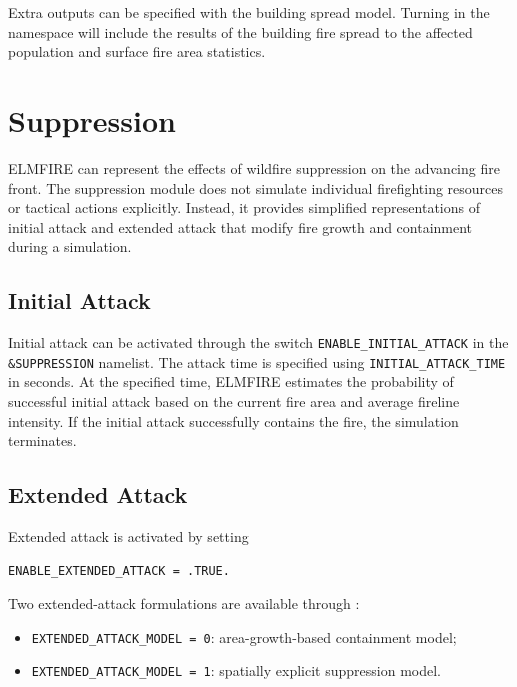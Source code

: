 Extra outputs can be specified with the building spread model. Turning  in the  namespace will include the results of the building fire spread to the affected population and surface fire area statistics.

\section{Suppression}
\label{suppression}

ELMFIRE can represent the effects of wildfire suppression on the advancing fire front. 
The suppression module does not simulate individual firefighting resources or tactical 
actions explicitly. Instead, it provides simplified representations of initial attack 
and extended attack that modify fire growth and containment during a simulation.

\subsection{Initial Attack}

Initial attack can be activated through the switch 
\verb|ENABLE_INITIAL_ATTACK| in the \verb|&SUPPRESSION| namelist. 
The attack time is specified using \verb|INITIAL_ATTACK_TIME| in seconds. 
At the specified time, ELMFIRE estimates the probability of successful initial attack 
based on the current fire area and average fireline intensity. If the initial attack 
successfully contains the fire, the simulation terminates.

\subsection{Extended Attack}

Extended attack is activated by setting

\begin{verbatim}
ENABLE_EXTENDED_ATTACK = .TRUE.
\end{verbatim}

Two extended-attack formulations are available through :

\begin{itemize}
    \item \verb|EXTENDED_ATTACK_MODEL = 0|: area-growth-based containment model;
    \item \verb|EXTENDED_ATTACK_MODEL = 1|: spatially explicit suppression model.
\end{itemize}

